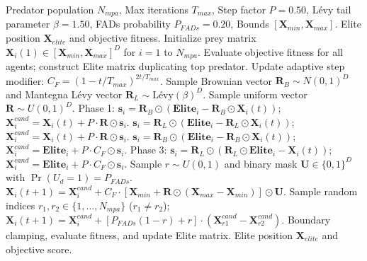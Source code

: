\documentclass[journal,compsoc]{IEEEtran}
\begin{document}
\begin{algorithm}[!t]
\caption{Marine Predators Algorithm (MPA) Sub-Population}
\label{alg:mpa}
\begin{algorithmic}[1]
\REQUIRE Predator population $N_{mpa}$, Max iterations $T_{max}$, Step factor $P=0.50$, L\'evy tail parameter $\beta=1.50$, FADs probability $P_{FADs}=0.20$, Bounds $[\mathbf{X}_{min}, \mathbf{X}_{max}]$.
\ENSURE Elite position $\mathbf{X}_{elite}$ and objective fitness.
\STATE Initialize prey matrix $\mathbf{X}_i(1) \in [\mathbf{X}_{min}, \mathbf{X}_{max}]^D$ for $i=1$ to $N_{mpa}$.
\STATE Evaluate objective fitness for all agents; construct Elite matrix duplicating top predator.
    \STATE Update adaptive step modifier: $C_F = (1 - t / T_{max})^{2 t / T_{max}}$.
        \STATE Sample Brownian vector $\mathbf{R}_B \sim N(0, 1)^D$ and Mantegna L\'evy vector $\mathbf{R}_L \sim \text{L\'evy}(\beta)^D$. Sample uniform vector $\mathbf{R} \sim U(0, 1)^D$.
            \STATE Phase 1: $\mathbf{s}_i = \mathbf{R}_B \odot (\mathbf{Elite}_i - \mathbf{R}_B \odot \mathbf{X}_i(t))$; \\
            $\mathbf{X}_i^{cand} = \mathbf{X}_i(t) + P \cdot \mathbf{R} \odot \mathbf{s}_i$.
                \STATE $\mathbf{s}_i = \mathbf{R}_L \odot (\mathbf{Elite}_i - \mathbf{R}_L \odot \mathbf{X}_i(t))$; $\mathbf{X}_i^{cand} = \mathbf{X}_i(t) + P \cdot \mathbf{R} \odot \mathbf{s}_i$.
            \ELSE
                \STATE $\mathbf{s}_i = \mathbf{R}_B \odot (\mathbf{Elite}_i - \mathbf{R}_B \odot \mathbf{X}_i(t))$; $\mathbf{X}_i^{cand} = \mathbf{Elite}_i + P \cdot C_F \odot \mathbf{s}_i$.
            \ENDIF
        \ELSE
            \STATE Phase 3: $\mathbf{s}_i = \mathbf{R}_L \odot (\mathbf{R}_L \odot \mathbf{Elite}_i - \mathbf{X}_i(t))$; \\
            $\mathbf{X}_i^{cand} = \mathbf{Elite}_i + P \cdot C_F \odot \mathbf{s}_i$.
        \ENDIF
    \ENDFOR
        \STATE Sample $r \sim U(0, 1)$ and binary mask $\mathbf{U} \in \{0, 1\}^D$ with $\Pr(U_d = 1) = P_{FADs}$.
            \STATE $\mathbf{X}_i(t+1) = \mathbf{X}_i^{cand} + C_F \cdot [\mathbf{X}_{min} + \mathbf{R} \odot (\mathbf{X}_{max} - \mathbf{X}_{min})] \odot \mathbf{U}$.
        \ELSE
            \STATE Sample random indices $r_1, r_2 \in \{1, \dots, N_{mpa}\}$ ($r_1 \neq r_2$); \\
            $\mathbf{X}_i(t+1) = \mathbf{X}_i^{cand} + [P_{FADs}(1 - r) + r] \cdot (\mathbf{X}_{r1}^{cand} - \mathbf{X}_{r2}^{cand})$.
        \ENDIF
    \ENDFOR
    \STATE Boundary clamping, evaluate fitness, and update Elite matrix.
\ENDFOR
\RETURN Elite position $\mathbf{X}_{elite}$ and objective score.
\end{algorithmic}
\end{algorithm}
\end{document}
